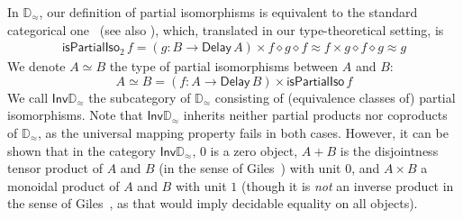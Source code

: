 \documentclass[runningheads,a4paper]{llncs}
\newcommand{\Pio}{\ensuremath{\mathsf{\Pi}^{\mathsf{o}}}}
\newcommand{\Inv}{\mathsf{Inv}}
\newcommand{\Delay}{\ensuremath{\mathsf{Delay}\,}}
\newcommand{\D}{\mathbb{D}}
\newcommand{\Dapprox}{\mathbb{D}_{\approx}}
\newcommand{\piso}{\mathsf{isPartialIso}}
\newcommand{\pisoalt}{\mathsf{isPartialIso}_2}
\begin{document}
In $\Dapprox$, our definition of partial isomorphisms is equivalent to
the standard categorical one~\cite{Kastl79} (see also \cite{CockettL02}),
which, translated in our type-theoretical setting, is
\begin{align*}
\pisoalt \,f = (g : B \to \Delay A) \times f \diamond g \diamond
  f \approx f \times g \diamond f \diamond g \approx g 
\end{align*}
We denote $A \simeq B$ the type of partial isomorphisms between
$A$ and $B$:
\[
A \simeq B = (f : A \to \Delay B) \times \piso \,f
\]
We call $\Inv \Dapprox$ the subcategory of $\Dapprox$ consisting of
(equivalence classes of) partial isomorphisms. Note that $\Inv\Dapprox$
inherits neither partial products nor coproducts of $\Dapprox$, as the
universal mapping property fails in both cases. However, it can be shown that
in the category $\Inv\Dapprox$, $0$ is a zero object, $A + B$ is the
disjointness tensor product of $A$ and $B$ (in the sense of Giles~\cite{Giles})
with unit $0$, and $A \times B$ a monoidal product of $A$ and $B$ with unit $1$
(though it is \emph{not} an inverse product in the sense of
Giles~\cite{Giles}, as that would imply decidable equality on all objects).



\end{document}
